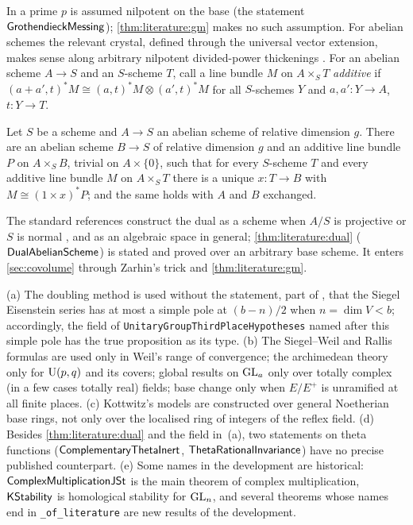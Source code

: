 In \cite{Messing1972} a prime $p$ is assumed nilpotent on the base (the statement
$\mathsf{GrothendieckMessing}$); \cref{thm:literature:gm} makes no such assumption.  For abelian
schemes the relevant crystal, defined through the universal vector extension, makes sense along
arbitrary nilpotent divided-power thickenings \cite{MazurMessing1974}.  For an abelian scheme $A\to S$
and an $S$-scheme $T$, call a line bundle $M$ on $A\times_ST$ \emph{additive} if
$(a+a',t)^*M\cong(a,t)^*M\otimes(a',t)^*M$ for all $S$-schemes $Y$ and $a,a':Y\to A$, $t:Y\to T$.

\begin{theorem}\Fmark\label{thm:literature:dual}
Let $S$ be a scheme and $A\to S$ an abelian scheme of relative dimension $g$.  There are an abelian
scheme $B\to S$ of relative dimension $g$ and an additive line bundle $P$ on $A\times_SB$, trivial
on $A\times\{0\}$, such that for every $S$-scheme $T$ and every additive line bundle $M$ on
$A\times_ST$ there is a unique $x:T\to B$ with $M\cong(1\times x)^*P$; and the same holds with
$A$ and $B$ exchanged.
\end{theorem}

The standard references construct the dual as a scheme when $A/S$ is projective
\cite{MumfordFogartyKirwan1994} or $S$ is normal \cite{FaltingsChai1990}, and as an algebraic space
in general; \cref{thm:literature:dual} ($\mathsf{DualAbelianScheme}$) is stated and proved over an
arbitrary base scheme.  It enters \cref{sec:covolume} through Zarhin's trick and
\cref{thm:literature:gm}.

  (a) The doubling method is used without the statement, part of
\cite{GelbartPiatetskiShapiroRallis1987,PiatetskiShapiroRallis1987}, that the Siegel Eisenstein
series has at most a simple pole at $(b-n)/2$ when $n=\dim V<b$; accordingly, the field of
\texttt{UnitaryGroupThirdPlaceHypotheses} named after this simple pole has the true proposition as
its type.  (b) The Siegel--Weil and Rallis formulas
are used only in Weil's range of convergence; the archimedean theory only for $\operatorname{U}(p,q)$ and its
covers; global results on $\operatorname{GL}_a$ only over totally complex (in a few cases totally real) fields;
base change only when $E/E^+$ is unramified at all finite places.  (c) Kottwitz's models are
constructed over general Noetherian base rings, not only over the localised ring of integers of the
reflex field.  (d) Besides \cref{thm:literature:dual} and the field in~(a), two statements on theta
functions ($\mathsf{ComplementaryThetaInert}$, $\mathsf{ThetaRationalInvariance}$) have no precise
published counterpart.  (e) Some names in the development are historical:
$\mathsf{ComplexMultiplicationJSt}$ is the main theorem of complex multiplication,
$\mathsf{KStability}$ is homological stability for $\operatorname{GL}_n$, and several theorems whose names end in
\texttt{\_of\_literature} are new results of the development.

